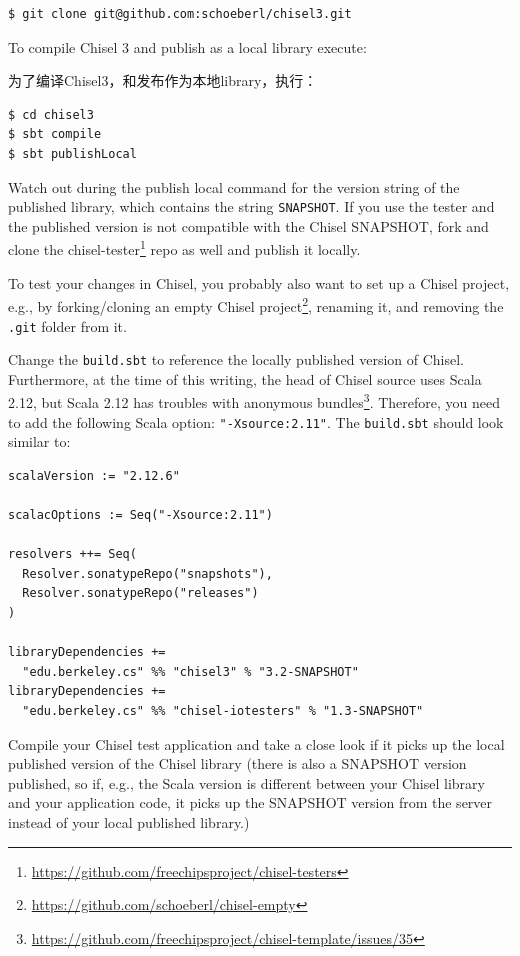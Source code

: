\documentclass[%
    10pt,
    headinclude, footexclude,
    openright, %
    notitlepage,
    cleardoubleempty,
    headsepline,
    pointlessnumbers,
    bibtotoc, idxtotoc,
    ]{scrbook}
\newcommand{\code}[1]{{\small{\texttt{#1}}}}
\newcommand{\myref}[2]{\href{#1}{#2}}
\renewcommand{\myref}[2]{{#2}{\footnote{\url{#1}}}}
\begin{document}
{\begin{verbatim}
$ git clone git@github.com:schoeberl/chisel3.git
\end{verbatim}

To compile Chisel 3 and publish as a local library execute:

为了编译Chisel3，和发布作为本地library，执行：

\begin{verbatim}
$ cd chisel3
$ sbt compile
$ sbt publishLocal
\end{verbatim}

Watch out during the publish local command for the version string of the published
library, which contains the string \code{SNAPSHOT}.
If you use the tester and the published version is not compatible with the Chisel
SNAPSHOT, fork and clone the \myref{https://github.com/freechipsproject/chisel-testers}{chisel-tester}
repo as well and publish it locally.



To test your changes in Chisel, you probably also want to set up a Chisel project,
e.g., by forking/cloning an \myref{https://github.com/schoeberl/chisel-empty}{empty Chisel project},
renaming it, and removing the \code{.git} folder from it.

Change the \code{build.sbt} to reference the locally published version of Chisel.
Furthermore, at the time of this writing, the head of Chisel source uses Scala 2.12, but Scala
2.12 has troubles with
\myref{https://github.com/freechipsproject/chisel-template/issues/35}{anonymous bundles}.
Therefore, you need to add the following Scala option: \code{"-Xsource:2.11"}.
The \code{build.sbt} should look similar to:

\begin{verbatim}
scalaVersion := "2.12.6"

scalacOptions := Seq("-Xsource:2.11")

resolvers ++= Seq(
  Resolver.sonatypeRepo("snapshots"),
  Resolver.sonatypeRepo("releases")
)

libraryDependencies +=
  "edu.berkeley.cs" %% "chisel3" % "3.2-SNAPSHOT"
libraryDependencies +=
  "edu.berkeley.cs" %% "chisel-iotesters" % "1.3-SNAPSHOT"
\end{verbatim}

Compile your Chisel test application and take a close look if it picks up the local published
version of the Chisel library (there is also a SNAPSHOT version published, so if, e.g.,
the Scala version is different between your Chisel library and your application code,
it picks up the SNAPSHOT version from the server instead of your local published
library.)

}
\end{document}
